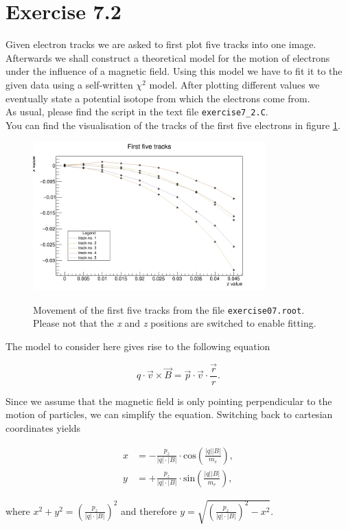 \documentclass[10pt]{article}
\newenvironment{myfont}{\fontfamily{put}\selectfont}{\par}
\begin{document}
\begin{myfont}
\section*{Exercise 7.2}

Given electron tracks we are asked to first plot five tracks into one image.
Afterwards we shall construct a theoretical model for the motion of electrons under the influence of a magnetic field.
Using this model we have to fit it to the given data using a self-written $\chi^{2}$ model.
After plotting different values we eventually state a potential isotope from which the electrons come from. \\

\noindent As usual, please find the script in the text file \texttt{exercise7\_2.C}. \\
You can find the visualisation of the tracks of the first five electrons in figure \ref{fig:ex7_2_tracks}.

\begin{figure}[h]
  \centering
  \caption{Movement of the first five tracks from the file \texttt{exercise07.root}.
  Please not that the \textit{x} and \textit{z} positions are switched to enable fitting.}
  \includegraphics[width = 0.8\textwidth]{./tracks.png}
  \label{fig:ex7_2_tracks}
\end{figure}

\noindent The model to consider here gives rise to the following equation

\begin{equation}
  q\cdot \vec{v} \times \vec{B} = \vec{p}\cdot \vec{v} \cdot \frac{\vec{r}}{r}.
\end{equation}

\noindent Since we assume that the magnetic field is only pointing perpendicular to the motion of particles, we can simplify the equation.
Switching back to cartesian coordinates yields

\begin{align}
x  & = - \frac{p_{z}}{|q| \cdot |B|} \cdot \textrm{cos}\left(\frac{|q||B|}{m_{e}}\right), \\
y  & = + \frac{p_{z}}{|q| \cdot |B|} \cdot \textrm{sin}\left(\frac{|q||B|}{m_{e}}\right),
\end{align}

\noindent where $x^{2} + y^{2} = \left(\frac{p_{z}}{|q| \cdot |B|}\right)^{2}$ and therefore $y = \sqrt{\left(\frac{p_{z}}{|q| \cdot |B|}\right)^{2} - x^{2}}$. \\


\end{myfont}
\end{document}
